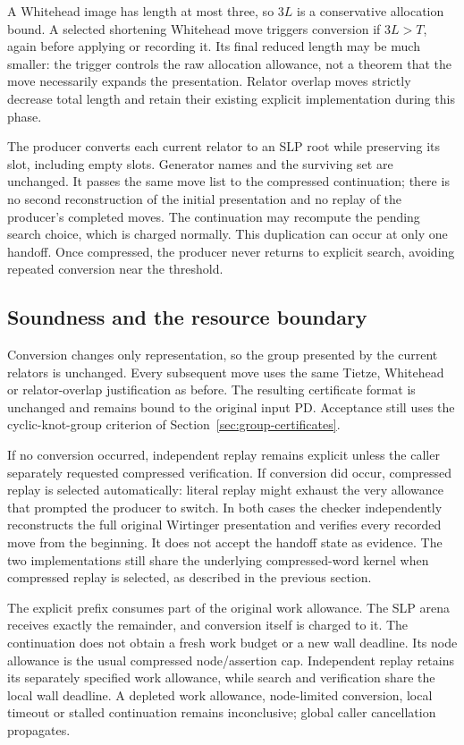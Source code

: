 A Whitehead image has length at most three, so $3L$ is a conservative
allocation bound. A selected shortening Whitehead move triggers conversion
if $3L>T$, again before applying or recording it. Its final reduced length
may be much smaller: the trigger controls the raw allocation allowance,
not a theorem that the move necessarily expands the presentation. Relator
overlap moves strictly decrease total length and retain their existing
explicit implementation during this phase.

The producer converts each current relator to an SLP root while preserving
its slot, including empty slots. Generator names and the surviving set are
unchanged. It passes the same move list to the compressed continuation;
there is no second reconstruction of the initial presentation and no
replay of the producer's completed moves. The continuation may recompute
the pending search choice, which is charged normally. This duplication
can occur at only one handoff. Once compressed, the producer never returns
to explicit search, avoiding repeated conversion near the threshold.

\subsection{Soundness and the resource boundary}

Conversion changes only representation, so the group presented by the
current relators is unchanged. Every subsequent move uses the same Tietze,
Whitehead or relator-overlap justification as before. The resulting
certificate format is unchanged and remains bound to the original input
PD. Acceptance still uses the cyclic-knot-group criterion of
Section~\ref{sec:group-certificates}.

If no conversion occurred, independent replay remains explicit unless the
caller separately requested compressed verification. If conversion did
occur, compressed replay is selected automatically: literal replay might
exhaust the very allowance that prompted the producer to switch. In both
cases the checker independently reconstructs the full original Wirtinger
presentation and verifies every recorded move from the beginning. It does
not accept the handoff state as evidence. The two implementations still
share the underlying compressed-word kernel when compressed replay is
selected, as described in the previous section.

The explicit prefix consumes part of the original work allowance. The
SLP arena receives exactly the remainder, and conversion itself is charged
to it. The continuation does not obtain a fresh work budget or a new wall
deadline. Its node allowance is the usual compressed node/assertion cap.
Independent replay retains its separately specified work allowance, while
search and verification share the local wall deadline. A depleted work
allowance, node-limited conversion, local timeout or stalled continuation remains
inconclusive; global caller cancellation propagates.

